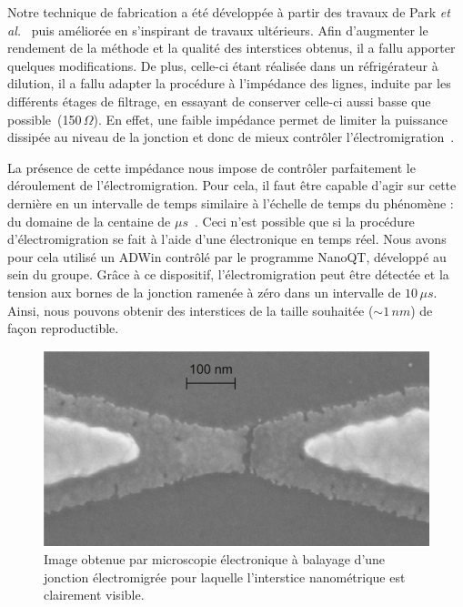 Notre technique de fabrication a été développée à partir des travaux de Park \textit{et al.}~\cite{Park1999} puis améliorée en s'inspirant de travaux ultérieurs.
Afin d'augmenter le rendement de la méthode et la qualité des interstices obtenus, il a fallu apporter quelques modifications. De plus, celle-ci étant réalisée dans un réfrigérateur à dilution, il a fallu adapter la procédure à l'impédance des lignes, induite par les différents étages de filtrage, en essayant de conserver celle-ci aussi basse que possible~(150\,$\Omega$). En effet, une faible impédance permet de limiter la puissance dissipée au niveau de la jonction et donc de mieux contrôler l'électromigration~\cite{Zant2006,Trouwborst2006,Taychatanapat2007}.

La présence de cette impédance nous impose de contrôler parfaitement le déroulement de l'électromigration. Pour cela, il faut être capable d'agir sur cette dernière en un intervalle de temps similaire à l'échelle de temps du phénomène : du domaine de la centaine de $\mu s$~\cite{ONeill2007}. Ceci n'est possible que si la procédure d'électromigration se fait à l'aide d'une électronique en temps réel. Nous avons pour cela utilisé un ADWin contrôlé par le programme NanoQT, développé au sein du groupe. Grâce à ce dispositif, l'électromigration peut être détectée et la tension aux bornes de la jonction ramenée à zéro dans un intervalle de $10\, \mu s$. Ainsi, nous pouvons obtenir des interstices de la taille souhaitée ($\sim 1\,nm$) de façon reproductible. 



\begin{figure}
\parbox{7cm}{
\includegraphics[scale=0.45]{Fabrication/JonctionElecromig/JonctionElecromig.pdf} 
}
\parbox{5cm}{\caption{Image obtenue par microscopie électronique à balayage d'une jonction électromigrée pour laquelle l'interstice nanométrique est clairement visible.}
}
\end{figure}


